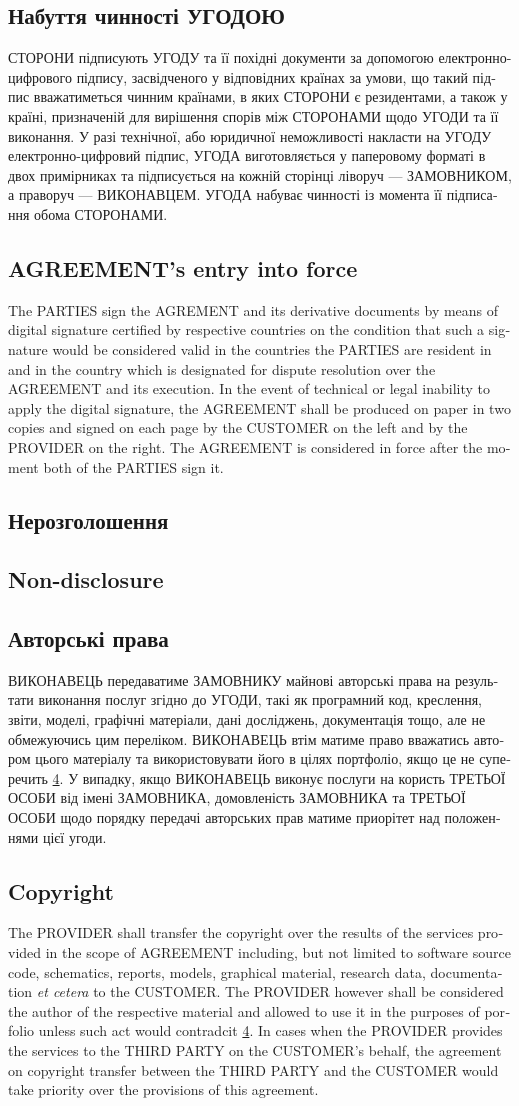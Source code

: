 \documentclass[a4paper]{article}
\newcommand\freetextcommon[3]{\begin{ukrainian}#1\end{ukrainian}\switchcolumn\begin{english}#2\end{english}\switchcolumn\begin{estonian}#3\end{estonian}}
\newcommand\freetext[3]{\freetextcommon{#1}{#2}{#3}\switchcolumn*}
\newcommand\clause[6]{\freetext{\section{#1}#4}{\section{#2}#5}{\section{#3}#6}}
\newcommand\smartref[2]{\hyperref[#1]{#2\ref{#1}}}
\begin{document}
\begin{Form}
\begin{paracol}{3}
        {}
      \clause
        {Набуття чинності УГОДОЮ}
        {AGREEMENT's entry into force}
        {}
        {СТОРОНИ підписують УГОДУ та її похідні документи за допомогою електронно-цифрового підпису, засвідченого у відповідних країнах за умови, що такий підпис вважатиметься чинним країнами, в яких СТОРОНИ є резидентами, а також у країні, призначеній для вирішення спорів між СТОРОНАМИ щодо УГОДИ та її виконання. У разі технічної, або юридичної неможливості накласти на УГОДУ електронно-цифровий підпис, УГОДА виготовляється у паперовому форматі в двох примірниках та підписується на кожній сторінці ліворуч — ЗАМОВНИКОМ, а праворуч — ВИКОНАВЦЕМ. УГОДА набуває чинності із момента її підписання обома СТОРОНАМИ.}
        {The PARTIES sign the AGREMENT and its derivative documents by means of digital signature certified by respective countries on the condition that such a signature would be considered valid in the countries the PARTIES are resident in and in the country which is designated for dispute resolution over the AGREEMENT and its execution. In the event of technical or legal inability to apply the digital signature, the AGREEMENT shall be produced on paper in two copies and signed on each page by the CUSTOMER on the left and by the PROVIDER on the right. The AGREEMENT is considered in force after the moment both of the PARTIES sign it.}
        {}
      \clause
        {Нерозголошення}
        {Non-disclosure}
        {}
        {\label{sec:nda}}
        {}
        {}
      \clause
        {Авторські права}
        {Copyright}
        {}
        {ВИКОНАВЕЦЬ передаватиме ЗАМОВНИКУ майнові авторські права на результати виконання послуг згідно до УГОДИ, такі як програмний код, креслення, звіти, моделі, графічні матеріали, дані досліджень, документація тощо, але не обмежуючись цим переліком. ВИКОНАВЕЦЬ втім матиме право вважатись автором цього матеріалу та використовувати його в цілях портфоліо, якщо це не суперечить \smartref{sec:nda}{}. У випадку, якщо ВИКОНАВЕЦЬ виконує послуги на користь ТРЕТЬОЇ ОСОБИ від імені ЗАМОВНИКА, домовленість ЗАМОВНИКА та ТРЕТЬОЇ ОСОБИ щодо порядку передачі авторських прав матиме приорітет над положеннями цієї угоди.}
        {The PROVIDER shall transfer the copyright over the results of the services provided in the scope of AGREEMENT including, but not limited to software source code, schematics, reports, models, graphical material, research data, documentation \emph{et cetera} to the CUSTOMER. The PROVIDER however shall be considered the author of the respective material and allowed to use it in the purposes of porfolio unless such act would contradcit \smartref{sec:nda}{}. In cases when the PROVIDER provides the services to the THIRD PARTY on the CUSTOMER's behalf, the agreement on copyright transfer between the THIRD PARTY and the CUSTOMER would take priority over the provisions of this agreement.}
        {}
    \end{paracol}
  \appendix
  
  
  
  \end{Form}
\end{document}
